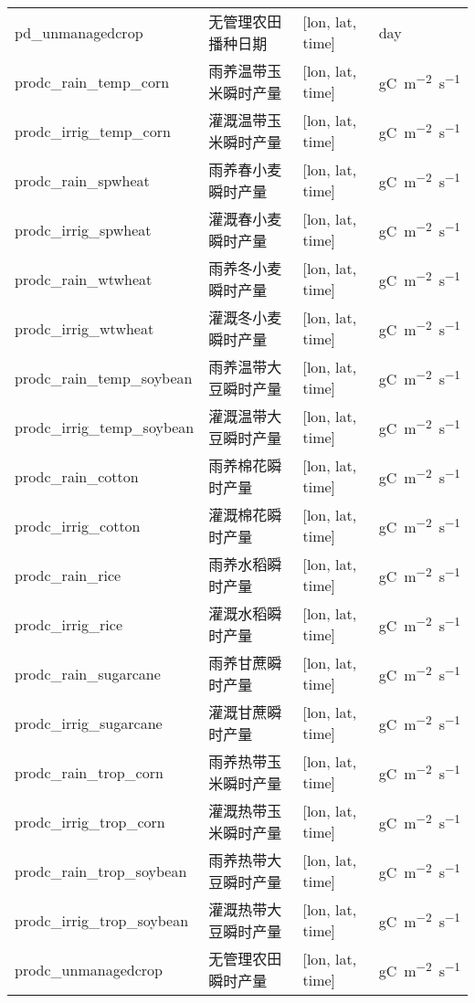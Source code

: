 {\begin{longtable}[htbp]{lp{}ll}
pd\_unmanagedcrop & 无管理农田播种日期 & {[}lon, lat, time{]} & \unit{day} \\
prodc\_rain\_temp\_corn & 雨养温带玉米瞬时产量 & {[}lon, lat, time{]} & \unit{gC.m^{-2}.s^{-1}} \\
prodc\_irrig\_temp\_corn & 灌溉温带玉米瞬时产量 & {[}lon, lat, time{]} & \unit{gC.m^{-2}.s^{-1}} \\
prodc\_rain\_spwheat & 雨养春小麦瞬时产量 & {[}lon, lat, time{]} & \unit{gC.m^{-2}.s^{-1}} \\
prodc\_irrig\_spwheat & 灌溉春小麦瞬时产量 & {[}lon, lat, time{]} & \unit{gC.m^{-2}.s^{-1}} \\
prodc\_rain\_wtwheat & 雨养冬小麦瞬时产量 & {[}lon, lat, time{]} & \unit{gC.m^{-2}.s^{-1}} \\
prodc\_irrig\_wtwheat & 灌溉冬小麦瞬时产量 & {[}lon, lat, time{]} & \unit{gC.m^{-2}.s^{-1}} \\
prodc\_rain\_temp\_soybean & 雨养温带大豆瞬时产量 & {[}lon, lat, time{]} & \unit{gC.m^{-2}.s^{-1}} \\
prodc\_irrig\_temp\_soybean & 灌溉温带大豆瞬时产量 & {[}lon, lat, time{]} & \unit{gC.m^{-2}.s^{-1}} \\
prodc\_rain\_cotton & 雨养棉花瞬时产量 & {[}lon, lat, time{]} & \unit{gC.m^{-2}.s^{-1}} \\
prodc\_irrig\_cotton & 灌溉棉花瞬时产量 & {[}lon, lat, time{]} & \unit{gC.m^{-2}.s^{-1}} \\
prodc\_rain\_rice & 雨养水稻瞬时产量 & {[}lon, lat, time{]} & \unit{gC.m^{-2}.s^{-1}} \\
prodc\_irrig\_rice & 灌溉水稻瞬时产量 & {[}lon, lat, time{]} & \unit{gC.m^{-2}.s^{-1}} \\
prodc\_rain\_sugarcane & 雨养甘蔗瞬时产量 & {[}lon, lat, time{]} & \unit{gC.m^{-2}.s^{-1}} \\
prodc\_irrig\_sugarcane & 灌溉甘蔗瞬时产量 & {[}lon, lat, time{]} & \unit{gC.m^{-2}.s^{-1}} \\
prodc\_rain\_trop\_corn & 雨养热带玉米瞬时产量 & {[}lon, lat, time{]} & \unit{gC.m^{-2}.s^{-1}} \\
prodc\_irrig\_trop\_corn & 灌溉热带玉米瞬时产量 & {[}lon, lat, time{]} & \unit{gC.m^{-2}.s^{-1}} \\
prodc\_rain\_trop\_soybean & 雨养热带大豆瞬时产量 & {[}lon, lat, time{]} & \unit{gC.m^{-2}.s^{-1}} \\
prodc\_irrig\_trop\_soybean & 灌溉热带大豆瞬时产量 & {[}lon, lat, time{]} & \unit{gC.m^{-2}.s^{-1}} \\
prodc\_unmanagedcrop & 无管理农田瞬时产量 & {[}lon, lat, time{]} & \unit{gC.m^{-2}.s^{-1}} \\
\end{longtable}}

